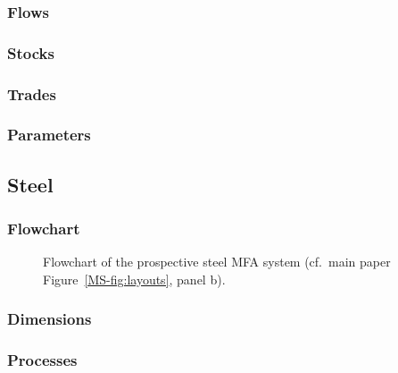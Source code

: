 \subsubsection{Flows}

\subsubsection{Stocks}

\subsubsection{Trades}

\clearpage
\begin{landscape}
\subsubsection{Parameters}
\end{landscape}
\clearpage

\subsection{Steel}

\subsubsection{Flowchart}
\begin{figure}[htbp]
    \centering
    \caption{Flowchart of the prospective steel MFA system (cf.\ main paper Figure~\ref{MS-fig:layouts}, panel b).}
    \label{fig:flowachart_steel}
\end{figure}

\clearpage

\subsubsection{Dimensions}

\subsubsection{Processes}

